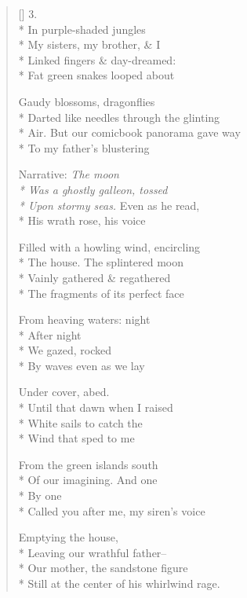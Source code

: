 \begin{verse}[\versewidth]
3.\\*
In purple-shaded jungles\\*
My sisters, my brother, \& I\\*
Linked fingers \& day-dreamed:\\*
Fat green snakes looped about

Gaudy blossoms, dragonflies\\*
Darted like needles through the glinting\\*
Air. But our comicbook panorama gave way\\*
To my father's blustering

Narrative: \textit{The moon\\*
Was a ghostly galleon, tossed\\*
Upon stormy seas.} Even as he read,\\*
His wrath rose, his voice

Filled with a howling wind, encircling\\*
The house. The splintered moon\\*
Vainly gathered \& regathered\\*
The fragments of its perfect face

From heaving waters: night\\*
After night\\*
We gazed, rocked\\*
By waves even as we lay

Under cover, abed.\\*
Until that dawn when I raised\\*
White sails to catch the \\*
Wind that sped to me

From the green islands south\\*
Of our imagining. And one\\*
By one\\*
Called you after me, my siren's voice

Emptying the house,\\*
Leaving our wrathful father--\\*
Our mother, the sandstone figure\\*
Still at the center of his whirlwind rage.
\end{verse}
